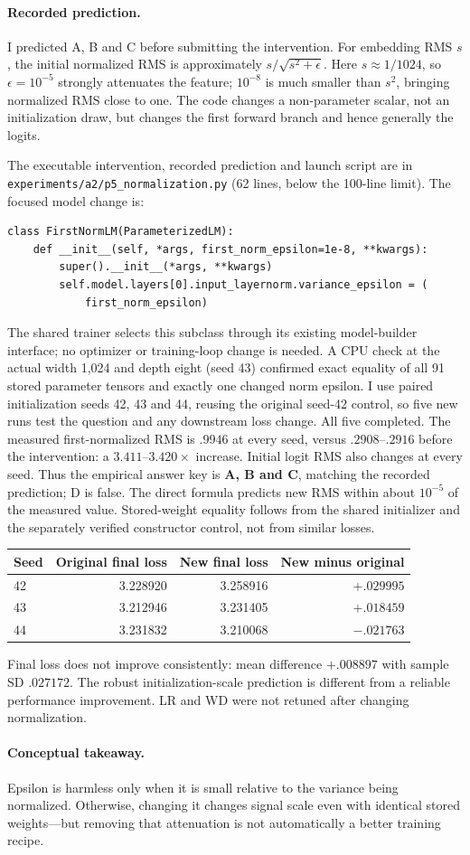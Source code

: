 \documentclass{article}
\begin{document}
\paragraph{Recorded prediction.} I predicted A, B and C before
submitting the intervention. For embedding RMS $s$, the initial
normalized RMS is approximately $s/\sqrt{s^2+\epsilon}$. Here
$s\approx1/1024$, so $\epsilon=10^{-5}$ strongly attenuates the feature;
$10^{-8}$ is much smaller than $s^2$, bringing normalized RMS close to
one. The code changes a non-parameter scalar, not an initialization
draw, but changes the first forward branch and hence generally the logits.

The executable intervention, recorded prediction and launch script are
in \texttt{experiments/a2/p5\_normalization.py} (62 lines, below the
100-line limit). The focused model change is:
\begin{verbatim}
class FirstNormLM(ParameterizedLM):
    def __init__(self, *args, first_norm_epsilon=1e-8, **kwargs):
        super().__init__(*args, **kwargs)
        self.model.layers[0].input_layernorm.variance_epsilon = (
            first_norm_epsilon)
\end{verbatim}
The shared trainer selects this subclass through its existing model-builder
interface; no optimizer or training-loop change is needed.
A CPU check at the actual width 1,024 and depth eight (seed 43) confirmed
exact equality of all 91 stored parameter tensors and exactly one changed
norm epsilon. I use paired initialization
seeds 42, 43 and 44, reusing the original seed-42 control, so five new
runs test the question and any downstream loss change. All five completed.
The measured first-normalized RMS is $.9946$ at every seed, versus
$.2908$--$.2916$ before the intervention: a $3.411$--$3.420\times$ increase.
Initial logit RMS also changes at every seed. Thus the empirical answer
key is \textbf{A, B and C}, matching the recorded prediction; D is false.
The direct formula predicts new RMS within about $10^{-5}$ of the
measured value. Stored-weight equality follows from the shared initializer
and the separately verified constructor control, not from similar losses.

\begin{center}
\begin{tabular}{lrrr}
\toprule
Seed & Original final loss & New final loss & New minus original \\
\midrule
42 & 3.228920 & 3.258916 & $+.029995$ \\
43 & 3.212946 & 3.231405 & $+.018459$ \\
44 & 3.231832 & 3.210068 & $-.021763$ \\
\bottomrule
\end{tabular}
\end{center}
Final loss does not improve consistently: mean difference $+.008897$
with sample SD $.027172$. The robust initialization-scale prediction is
different from a reliable performance improvement. LR and WD were not
retuned after changing normalization.

\paragraph{Conceptual takeaway.} Epsilon is harmless only when it is
small relative to the variance being normalized. Otherwise, changing it
changes signal scale even with identical stored weights---but removing
that attenuation is not automatically a better training recipe.
\end{document}
